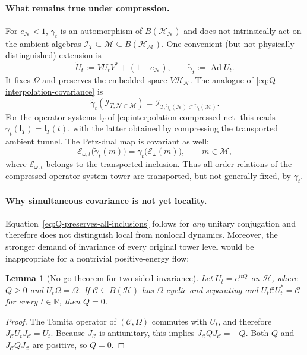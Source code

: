 \documentclass[a4paper,11pt]{article}
\newtheorem{lemma}[theorem]{Lemma}
\theoremstyle{definition}
\newcommand{\mN}{\mathcal{N}}
\newcommand{\mI}{\mathcal{I}}
\newcommand{\mH}{\mathcal{H}}
\newcommand{\mM}{\mathcal{M}}
\newcommand{\mE}{\mathcal{E}}
\begin{document}
\paragraph{What remains true under compression.}
For $e_\mN<1$, $\gamma_t$ is an automorphism of
$B(\mH_\mN)$ and does not intrinsically act on the ambient
algebras $\mI_T\subseteq\mM\subseteq B(\mH_\mM)$.
One convenient (but not physically distinguished) extension is
\begin{equation}
 \widetilde U_t:=VU_tV^*+(1-e_\mN),
 \qquad \widetilde\gamma_t:=\operatorname{Ad}\widetilde U_t.
 \label{eq:Q-ambient-extended-flow}
\end{equation}
It fixes $\Omega$ and preserves the embedded space $V\mH_\mN$.
The analogue of \eqref{eq:Q-interpolation-covariance} is
\begin{equation}
 \widetilde\gamma_t(\mI_{T,\mN\subset\mM})
 =\mI_{T,\widetilde\gamma_t(\mN)\subset
              \widetilde\gamma_t(\mM)}.
 \label{eq:Q-compressed-tunnel-transport}
\end{equation}
For the operator systems $\mathsf I_T$ of
\eqref{eq:interpolation-compressed-net} this reads
$\gamma_t(\mathsf I_T)=\mathsf I_T(t)$, with the latter obtained
by compressing the transported ambient tunnel. The Petz-dual map
is covariant as well:
\begin{equation}
 \mE_{\omega,t}\bigl(\widetilde\gamma_t(m)\bigr)
 =\gamma_t\bigl(\mE_\omega(m)\bigr),
 \qquad m\in\mM,
 \label{eq:Q-Petz-covariance}
\end{equation}
where $\mE_{\omega,t}$ belongs to the transported inclusion.
Thus all order relations of the compressed operator-system tower
are transported, but not generally fixed, by $\gamma_t$.

\paragraph{Why simultaneous covariance is not yet locality.}
Equation~\eqref{eq:Q-preserves-all-inclusions} follows for
\emph{any} unitary conjugation and therefore does not distinguish
local from nonlocal dynamics. Moreover, the stronger demand of
invariance of every original tower level would be inappropriate
for a nontrivial positive-energy flow:

\begin{lemma}[No-go theorem for two-sided invariance]
\label{lem:Q-fixed-standard-no-go}
Let $U_t=e^{itQ}$ on $\mH$, where $Q\geq0$ and
$U_t\Omega=\Omega$. If $\mathcal C\subseteq B(\mH)$ has
$\Omega$ cyclic and separating and
$U_t\mathcal C U_t^*=\mathcal C$ for every $t\in\mathbb R$,
then $Q=0$.
\end{lemma}
\begin{proof}
The Tomita operator of $(\mathcal C,\Omega)$ commutes with
$U_t$, and therefore $J_{\mathcal C}U_tJ_{\mathcal C}=U_t$.
Because $J_{\mathcal C}$ is antiunitary, this implies
$J_{\mathcal C}QJ_{\mathcal C}=-Q$. Both $Q$ and
$J_{\mathcal C}QJ_{\mathcal C}$ are positive, so $Q=0$.
\end{proof}
\end{document}
